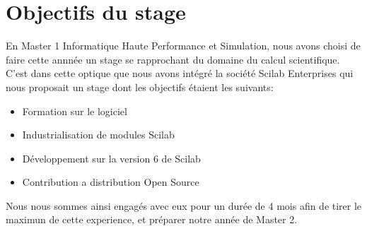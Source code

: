 \section*{Objectifs du stage}

En Master 1 Informatique Haute Performance et Simulation,
nous avons choisi de faire cette annnée un stage se rapprochant
du domaine du calcul scientifique.
C'est dans cette optique que nous avons intégré la société
{\sc Scilab Enterprises} qui nous proposait un stage dont
les objectifs étaient les suivants:

\begin{itemize}
\item Formation sur le logiciel
\item Industrialisation de modules Scilab
\item Développement sur la version 6 de Scilab
\item Contribution a distribution Open Source
\end{itemize}

Nous nous sommes ainsi engagés avec eux pour un durée de 4 mois
afin de tirer le maximun de cette experience,
et préparer notre année de Master 2.
